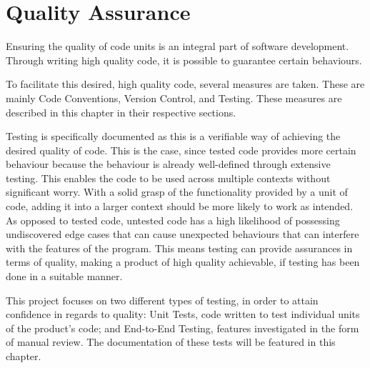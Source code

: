 \chapter{Quality Assurance}
Ensuring the quality of code units is an integral part of software development. Through writing high quality code, it is possible to guarantee certain behaviours. 

To facilitate this desired, high quality code, several measures are taken. These are mainly Code Conventions, Version Control, and Testing. These measures are described in this chapter in their respective sections.

Testing is specifically documented as this is a verifiable way of achieving the desired quality of code. This is the case, since tested code provides more certain behaviour because the behaviour is already well-defined through extensive testing. This enables the code to be used across multiple contexts without significant worry. With a solid grasp of the functionality provided by a unit of code, adding it into a larger context should be more likely to work as intended. As opposed to tested code, untested code has a high likelihood of possessing undiscovered edge cases that can cause unexpected behaviours that can interfere with the features of the program. This means testing can provide assurances in terms of quality, making a product of high quality achievable, if testing has been done in a suitable manner. 

This project focuses on two different types of testing, in order to attain confidence in regards to quality: Unit Tests, code written to test individual units of the product's code; and End-to-End Testing, features investigated in the form of manual review. The documentation of these tests will be featured in this chapter.



